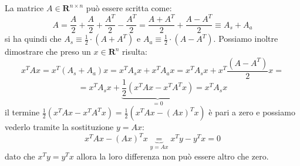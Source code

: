 \begin{flushleft}
La matrice $A\in\mathbf{R}^{n \times n}$ può essere scritta come:
\[
A=\frac{A}{2}+\frac{A}{2}+\frac{A^T}{2}-\frac{A^T}{2}=\frac{A+A^T}{2}+\frac{A-A^T}{2} \equiv A_s+A_a
\]
si ha quindi che $A_s \equiv \frac{1}{2}\cdot(A+A^T)$ e $A_a \equiv \frac{1}{2} \cdot (A-A^T)$. \newline
Possiamo inoltre dimostrare che preso un $x \in \mathbf{R}^n$ risulta:
\[
x^TAx=x^T(A_s+A_a)x=x^TA_sx+x^TA_ax=x^TA_sx+x^T\frac{(A-A^T)}{2}x =
\]
\[
= x^TA_sx+\underbrace{\frac{1}{2}(x^TAx-x^TA^Tx)}_{=0} = x^TA_sx
\]
il termine $\frac{1}{2}(x^TAx-x^TA^Tx)=\frac{1}{2}(x^TAx-(Ax)^Tx)$ è pari a zero e possiamo vederlo tramite la sostituzione $y=Ax$:
\[
x^TAx-(Ax)^Tx \underbrace{=}_{y=Ax} x^Ty-y^Tx = 0
\]
dato che $x^Ty=y^Tx$ allora la loro differenza non può essere altro che zero.
\end{flushleft}